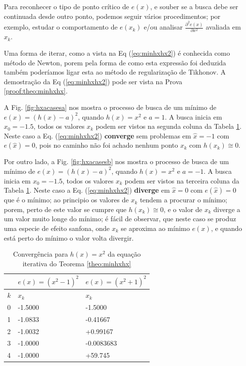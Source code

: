 \begin{theorem}
Para reconhecer o tipo de ponto crítico de $e(x)$, e souber se 
a busca debe ser continuada desde outro ponto, 
podemos seguir vários procedimentos; por exemplo, estudar o comportamento 
de $e(x_k)$ e/ou analisar  $\frac{\partial^2 e(x)}{\partial x^2}$ avaliada em $x_k$.

Uma forma de iterar, como a vista na Eq (\ref{eq:minhxhx2}) é conhecida como método de Newton,
porem pela forma de como esta expressão foi deduzida também poderíamos ligar esta ao
método de regularização de Tikhonov.
A demostração da Eq (\ref{eq:minhxhx2}) pode ser vista na Prova \ref{proof:theo:minhxhx}.
\end{theorem}



\begin{example}\label{ex:minhxhx}
 A Fig. \ref{fig:hxacasesa} nos mostra o processo de busca de um mínimo
 de $e(x)=(h(x)-a)^2$, quando $h(x)=x^2$ e $a=1$. A busca inicia em $x_0=-1.5$,
 todos os valores $x_{k}$ podem ser vistos na segunda coluna da
Tabela \ref{tab:hxacases}. Neste caso a Eq. (\ref{eq:minhxhx2}) \textbf{converge} sem problemas em $\hat{x}=-1$ com $e(\hat{x})=0$,
 pois no caminho não foi achado nenhum ponto $x_{k}$ com $h(x_{k})\cong 0$.

 Por outro lado, a Fig. \ref{fig:hxacasesb} nos mostra o processo de busca de um mínimo
 de $e(x)=(h(x)-a)^2$, quando $h(x)=x^2$ e $a=-1$. A busca inicia em $x_0=-1.5$,
 todos os valores $x_{k}$ podem ser vistos na terceira coluna da
Tabela \ref{tab:hxacases}. Neste caso a Eq. (\ref{eq:minhxhx2}) \textbf{diverge} 
em $\hat{x}=0$ com $e(\hat{x})=0$ que é o mínimo;
ao principio os valores de $x_{k}$ tendem a procurar o mínimo; porem,
perto de este valor se cumpre que $h(x_{k})\cong 0$, e o valor de $x_{k}$ diverge
a um valor muito longe do mínimo; é fácil de observar, que neste caso se produz 
uma especie de efeito sanfona, onde $x_{k}$ se aproxima ao mínimo $e(x)$, e quando 
está perto do mínimo o valor volta divergir.

\end{example}

\begin{table}[!h]
\centering
\begin{tabular}{|l|l|l|}
\hline
~&$e(x)=(x^2-1)^2$ & $e(x)=(x^2+1)^2$ \\ \hline
$k$&$x_k$  & $x_k$ \\ \hline
0&-1.5000  & -1.5000      \\
1&-1.0833  & -0.41667     \\
2&-1.0032  & +0.99167     \\
3&-1.0000  & -0.0083683   \\
4&-1.0000  & +59.745      \\  \hline
\end{tabular}
\caption{Convergência para $h(x)=x^2$ da equação iterativa do Teorema \ref{theo:minhxhx}}
\label{tab:hxacases}
\end{table}


